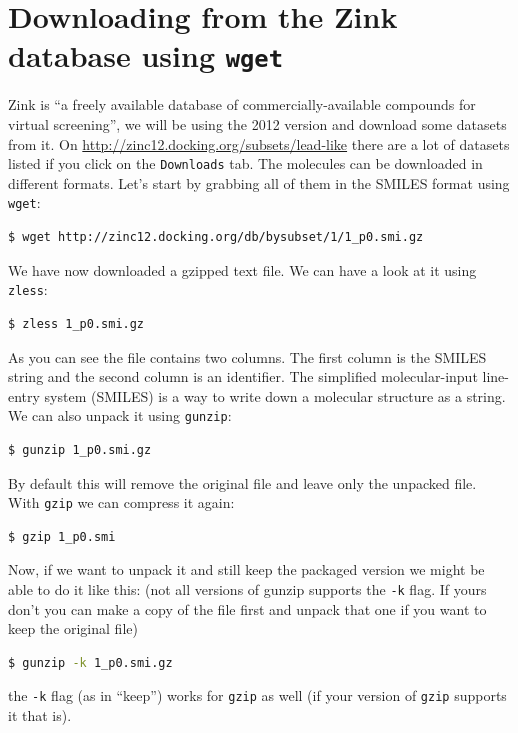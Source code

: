 \documentclass[watermark]{pbpreprint}
\begin{document}
\section{Downloading from the Zink database using \texttt{wget}}
Zink is ``a freely available database of commercially-available compounds for
virtual screening'', we will be using the 2012 version and download some
datasets from it. On \url{http://zinc12.docking.org/subsets/lead-like} there
are a lot of datasets listed if you click on the \texttt{Downloads} tab. The
molecules can be downloaded in different formats. Let's start by grabbing all
of them in the SMILES format using \texttt{wget}:
\begin{lstlisting}[language=bash]
$ wget http://zinc12.docking.org/db/bysubset/1/1_p0.smi.gz
\end{lstlisting}
We have now downloaded a gzipped text file. We can have a look at it using
\texttt{zless}:
%
\begin{lstlisting}[language=bash]
$ zless 1_p0.smi.gz
\end{lstlisting}
As you can see the file contains two columns. The first column is the SMILES
string and the second column is an identifier. The simplified molecular-input
line-entry system (SMILES) is a way to write down a molecular structure as a
string. We can also unpack it using \texttt{gunzip}:%
%
\begin{lstlisting}[language=bash]
$ gunzip 1_p0.smi.gz
\end{lstlisting}
By default this will remove the original file and leave only the unpacked
file. With \texttt{gzip} we can compress it again:
%
\begin{lstlisting}[language=bash]
$ gzip 1_p0.smi
\end{lstlisting}
Now, if we want to unpack it and still keep the packaged version we might be
able to do it like this: (not all versions of gunzip supports the \texttt{-k}
flag. If yours don't you can make a copy of the file first and unpack that one
if you want to keep the original file)
\begin{lstlisting}[language=bash]
$ gunzip -k 1_p0.smi.gz
\end{lstlisting}
the \texttt{-k} flag (as in ``keep'') works for \texttt{gzip} as well (if your
version of \texttt{gzip} supports it that is). 
\end{document}
